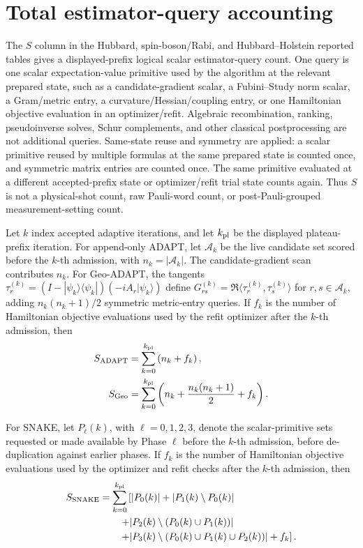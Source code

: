 \documentclass[
  reprint,
  amsmath,
  amssymb,
  aps,
  pra,
  nofootinbib,
  superscriptaddress,
  floatfix
]{revtex4-2}
\begin{document}
\appendix

\section{Total estimator-query accounting}
\label{app:estimator_queries}

The \(S\) column in the Hubbard, spin-boson/Rabi, and Hubbard--Holstein reported tables gives a displayed-prefix logical scalar estimator-query count. One query is one scalar expectation-value primitive used by the algorithm at the relevant prepared state, such as a candidate-gradient scalar, a Fubini--Study norm scalar, a Gram/metric entry, a curvature/Hessian/coupling entry, or one Hamiltonian objective evaluation in an optimizer/refit. Algebraic recombination, ranking, pseudoinverse solves, Schur complements, and other classical postprocessing are not additional queries. Same-state reuse and symmetry are applied: a scalar primitive reused by multiple formulas at the same prepared state is counted once, and symmetric matrix entries are counted once. The same primitive evaluated at a different accepted-prefix state or optimizer/refit trial state counts again. Thus \(S\) is not a physical-shot count, raw Pauli-word count, or post-Pauli-grouped measurement-setting count.

Let \(k\) index accepted adaptive iterations, and let \(k_{\rm pl}\) be the displayed plateau-prefix iteration. For append-only ADAPT, let \(\mathcal A_k\) be the live candidate set scored before the \(k\)-th admission, with \(n_k=|\mathcal A_k|\). The candidate-gradient scan contributes \(n_k\). For Geo-ADAPT, the tangents \(\tau_r^{(k)}=(I-|\psi_k\rangle\langle\psi_k|)(-iA_r|\psi_k\rangle)\) define \(G_{rs}^{(k)}=\Re\langle\tau_r^{(k)},\tau_s^{(k)}\rangle\) for \(r,s\in\mathcal A_k\), adding \(n_k(n_k+1)/2\) symmetric metric-entry queries. If \(f_k\) is the number of Hamiltonian objective evaluations used by the refit optimizer after the \(k\)-th admission, then
\begin{equation*}
\begin{aligned}
S_{\rm ADAPT}
&=
\sum_{k=0}^{k_{\rm pl}}
\left(n_k+f_k\right),
\\
S_{\rm Geo}
&=
\sum_{k=0}^{k_{\rm pl}}
\left(n_k+\frac{n_k(n_k+1)}{2}+f_k\right).
\end{aligned}
\end{equation*}

For SNAKE, let \(P_\ell(k)\), with \(\ell=0,1,2,3\), denote the scalar-primitive sets requested or made available by Phase \(\ell\) before the \(k\)-th admission, before de-duplication against earlier phases. If \(f_k\) is the number of Hamiltonian objective evaluations used by the optimizer and refit checks after the \(k\)-th admission, then
\begin{align}
S_{\rm SNAKE}
&=
\sum_{k=0}^{k_{\rm pl}}
\left[
|P_0(k)|+|P_1(k)\setminus P_0(k)|
\right.
\nonumber\\
&\qquad\left.
 +|P_2(k)\setminus(P_0(k)\cup P_1(k))|
\right.
\nonumber\\
&\qquad\left.
 +|P_3(k)\setminus(P_0(k)\cup P_1(k)\cup P_2(k))|
+f_k
\right].
\label{eq:appendix_s_snake}
\end{align}
\end{document}
